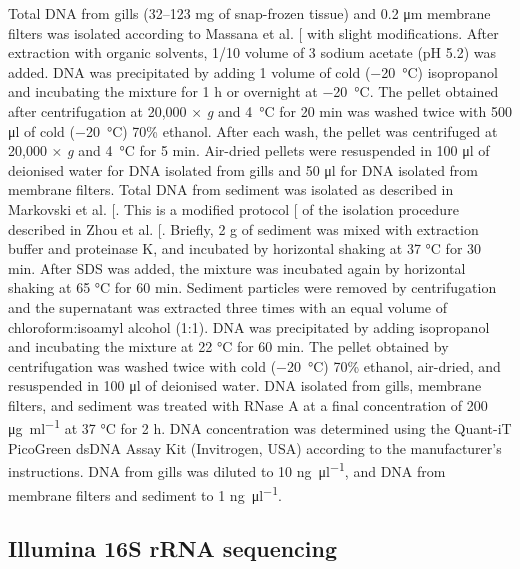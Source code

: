 \documentclass[
  12 pt,
]{article}
\begin{document}
Total DNA from gills (32--123 \unit{\mg} of snap-frozen tissue) and 0.2 \unit{\um} membrane filters was isolated according to Massana et al. {[}\citeproc{ref-Massana1997}{49}{]} with slight modifications. After extraction with organic solvents, 1/10 volume of 3 \unit{\Molar} sodium acetate (pH 5.2) was added. DNA was precipitated by adding 1 volume of cold (\qty{-20}{\degreeCelsius}) isopropanol and incubating the mixture for 1 \unit{\hour} or overnight at \qty{-20}{\degreeCelsius}. The pellet obtained after centrifugation at 20,000 × \emph{g} and \qty{4}{\degreeCelsius} for 20 \unit{\minute} was washed twice with 500 \unit{\ul} of cold (\qty{-20}{\degreeCelsius}) 70\unit{\percent} ethanol. After each wash, the pellet was centrifuged at 20,000 × \emph{g} and \qty{4}{\degreeCelsius} for 5 \unit{\minute}. Air-dried pellets were resuspended in 100 \unit{\ul} of deionised water for DNA isolated from gills and 50 \unit{\ul} for DNA isolated from membrane filters. Total DNA from sediment was isolated as described in Markovski et al. {[}\citeproc{ref-Markovski2022}{50}{]}. This is a modified protocol {[}\citeproc{ref-Pjevac2018}{51}{]} of the isolation procedure described in Zhou et al. {[}\citeproc{ref-Zhou1996}{52}{]}. Briefly, 2 \unit{\gram} of sediment was mixed with extraction buffer and proteinase K, and incubated by horizontal shaking at 37 \unit{\degreeCelsius} for 30 \unit{\minute}. After SDS was added, the mixture was incubated again by horizontal shaking at 65 \unit{\degreeCelsius} for 60 \unit{\minute}. Sediment particles were removed by centrifugation and the supernatant was extracted three times with an equal volume of chloroform:isoamyl alcohol (1:1). DNA was precipitated by adding isopropanol and incubating the mixture at 22 \unit{\degreeCelsius} for 60 \unit{\minute}. The pellet obtained by centrifugation was washed twice with cold (\qty{-20}{\degreeCelsius}) 70\unit{\percent} ethanol, air-dried, and resuspended in 100 \unit{\ul} of deionised water. DNA isolated from gills, membrane filters, and sediment was treated with RNase A at a final concentration of 200 \unit{\ug\per\ml} at 37 \unit{\degreeCelsius} for 2 \unit{\hour}. DNA concentration was determined using the Quant-iT PicoGreen dsDNA Assay Kit (Invitrogen, USA) according to the manufacturer's instructions. DNA from gills was diluted to 10 \unit{\ng\per\ul}, and DNA from membrane filters and sediment to 1 \unit{\ng\per\ul}.

\subsection{Illumina 16S rRNA sequencing}\label{illumina-16s-rrna-sequencing}
\end{document}
